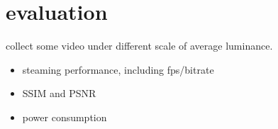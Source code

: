 \section{evaluation}

collect some video under different scale of average luminance.

\begin{itemize}
  \item{ steaming performance, including fps/bitrate }
  \item{ SSIM and PSNR }
  \item{ power consumption }
\end{itemize}
